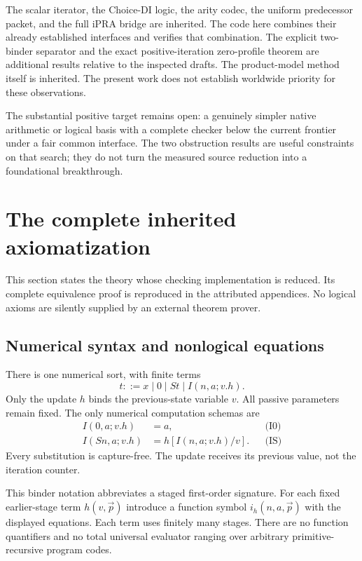 \documentclass[11pt,letterpaper]{article}
\theoremstyle{definition}\newtheorem{definition}[theorem]{Definition}
\theoremstyle{remark}\newtheorem{remark}[theorem]{Remark}
\begin{document}
The scalar iterator, the Choice-DI logic, the arity codec, the uniform
predecessor packet, and the full iPRA bridge are inherited. The code here
combines their already established interfaces and verifies that combination.
The explicit two-binder separator and the exact positive-iteration
zero-profile theorem are additional results relative to the inspected
drafts. The product-model method itself is inherited. The present work
does not establish worldwide priority for these observations.

The substantial positive target remains open: a genuinely simpler native
arithmetic or logical basis with a complete checker below the current
frontier under a fair common interface. The two obstruction results are
useful constraints on that search; they do not turn the measured source
reduction into a foundational breakthrough.

\section{The complete inherited axiomatization}
\label{sec:axioms}

This section states the theory whose checking implementation is reduced.
Its complete equivalence proof is reproduced in the attributed appendices.
No logical axioms are silently supplied by an external theorem prover.

\subsection{Numerical syntax and nonlogical equations}

There is one numerical sort, with finite terms
\[
 t ::= x\mid 0\mid St\mid I(n,a;v.h).
\]
Only the update $h$ binds the previous-state variable $v$. All passive
parameters remain fixed. The only numerical computation schemas are
\begin{align*}
 I(0,a;v.h)&=a, &&\text{(I0)}\\
 I(Sn,a;v.h)&=h[I(n,a;v.h)/v]. &&\text{(IS)}
\end{align*}
Every substitution is capture-free. The update receives its previous
value, not the iteration counter.

This binder notation abbreviates a staged first-order signature. For
each fixed earlier-stage term $h(v,\vec p)$ introduce a function symbol
$i_h(n,a,\vec p)$ with the displayed equations. Each term uses finitely
many stages. There are no function quantifiers and no total universal
evaluator ranging over arbitrary primitive-recursive program codes.
\end{document}
